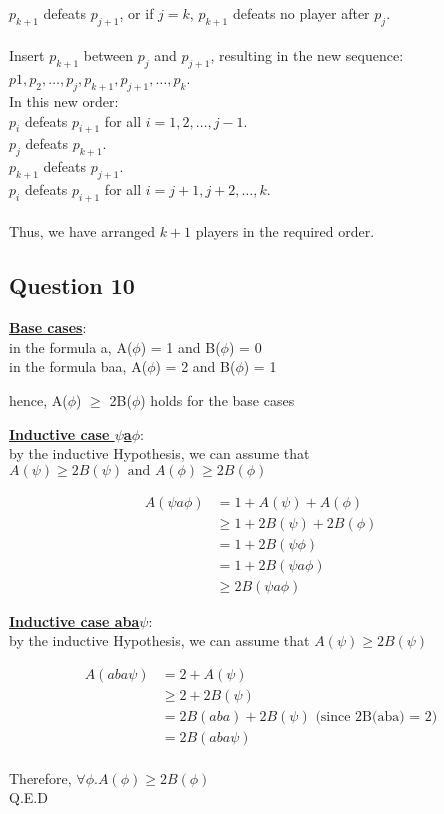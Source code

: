 \documentclass[11pt]{article}
\begin{document}
{{{$p_{k+1}$ defeats $p_{j+1}$,
or if $j = k$, $p_{k+1}$ defeats no player after $p_j$.\\
\\
Insert $p_{k+1}$ between $p_j$ and $p_{j+1}$, resulting in the new sequence:\\
$p1, p_2, \ldots, p_j, p_{k+1}, p_{j+1}, \ldots, p_k$.\\
In this new order:\\
$p_i$ defeats $p_{i+1}$ for all $i = 1, 2, \ldots, j-1$.\\
$p_j$ defeats $p_{k+1}$.\\
$p_{k+1}$ defeats $p_{j+1}$.\\
$p_i$ defeats $p_{i+1}$ for all $i = j+1, j+2, \ldots, k$.\\
\\
Thus, we have arranged $k+1$ players in the required order.\\

\subsection*{Question 10}
\underline{\textbf{Base cases}}: \\
in the formula a,
A($\phi$) = 1 and B($\phi$) = 0 \\
in the formula baa,
A($\phi$) = 2 and B($\phi$) = 1

hence, A($\phi$) $\geq$ 2B($\phi$) holds for the base cases

\noindent
\underline{\textbf{Inductive case $\psi$a$\phi$}}: \\
by the inductive Hypothesis, we can assume that
$A(\psi) \geq 2B(\psi) \text{ and } A(\phi) \geq 2B(\phi)$

\begin{align*}
    A(\psi a \phi) &= 1 + A(\psi) + A(\phi) \\
    &\geq 1 + 2B(\psi) + 2B(\phi) \\
    &= 1 + 2B(\psi \phi) \\
    &= 1 + 2B(\psi a \phi) \\
    &\geq 2B(\psi a \phi)
\end{align*}

\noindent
\underline{\textbf{Inductive case aba$\psi$}}: \\
by the inductive Hypothesis, we can assume that
$A(\psi) \geq 2B(\psi)$

\begin{align*}
    A(aba \psi) &= 2 + A(\psi) \\
    &\geq 2 + 2B(\psi) \\
    &= 2B(aba) + 2B(\psi) \text{ (since 2B(aba) = 2)} \\
    &= 2B(aba\psi)
\end{align*}
\\
Therefore, $\forall \phi . A(\phi) \geq 2B(\phi)$\\
Q.E.D
}}}
\end{document}
